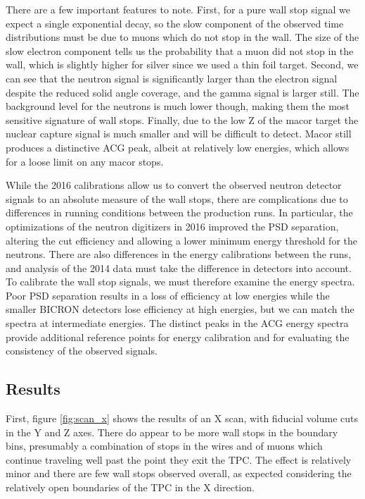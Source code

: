 There are a few important features to note.  
First, for a pure wall stop signal we expect a single exponential decay, so the slow component of the observed time distributions must be due to muons which do not stop in the wall.  
The size of the slow electron component tells us the probability that a muon did not stop in the wall, which is slightly higher for silver since we used a thin foil target.
Second, we can see that the neutron signal is significantly larger than the electron signal despite the reduced solid angle coverage, and the gamma signal is larger still.
The background level for the neutrons is much lower though, making them the most sensitive signature of wall stops.
Finally, due to the low Z of the macor target the nuclear capture signal is much smaller and will be difficult to detect.
Macor still produces a distinctive ACG peak, albeit at relatively low energies, which allows for a loose limit on any macor stops.

While the 2016 calibrations allow us to convert the observed neutron detector signals to an absolute measure of the wall stops, there are complications due to differences in running conditions between the production runs.
In particular, the optimizations of the neutron digitizers in 2016 improved the PSD separation, altering the cut efficiency and allowing a lower minimum energy threshold for the neutrons.
There are also differences in the energy calibrations between the runs, and analysis of the 2014 data must take the difference in detectors into account.
To calibrate the wall stop signals, we must therefore examine the energy spectra.
Poor PSD separation results in a loss of efficiency at low energies while the smaller BICRON detectors lose efficiency at high energies, but we can match the spectra at intermediate energies.
The distinct peaks in the ACG energy spectra provide additional reference points for energy calibration and for evaluating the consistency of the observed signals.

\subsection{Results}

First, figure \ref{fig:scan_x} shows the results of an X scan, with fiducial volume cuts in the Y and Z axes.  
There do appear to be more wall stops in the boundary bins, presumably a combination of stops in the wires and of muons which continue traveling well past the point they exit the TPC.
The effect is relatively minor and there are few wall stops observed overall, as expected considering the relatively open boundaries of the TPC in the X direction.

